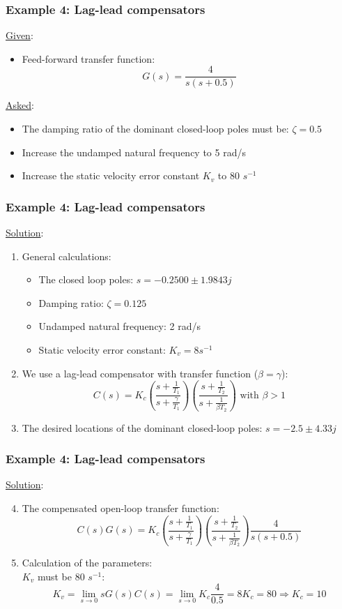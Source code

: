 \begin{frame}
	\frametitle{Example 4: Lag-lead compensators}
	\underline{Given}:
	\begin{itemize}
		\item Feed-forward transfer function: $$G(s)=\frac{4}{s(s+0.5)}$$
	\end{itemize}
	\underline{Asked}:
	\begin{itemize}
		\item The damping ratio of the dominant closed-loop poles must be: $\zeta=0.5$
		\item Increase the undamped natural frequency to 5 rad/s
		\item Increase the static velocity error constant $K_v$ to 80 $s^{-1}$
	\end{itemize}
\end{frame}

\begin{frame}
	\frametitle{Example 4: Lag-lead compensators}
	\underline{Solution}:
	\begin{enumerate}
		\item General calculations:
		\begin{itemize}
			\item The closed loop poles: $s=-0.2500\pm1.9843j$
			\item Damping ratio: $\zeta=0.125$
			\item Undamped natural frequency: 2 rad/s
			\item Static velocity error constant: $K_v=8s^{-1}$
		\end{itemize}
		\item We use a lag-lead compensator with transfer function ($\beta=\gamma$):
		$$C(s)=K_c(\frac{s+\frac{1}{T_1}}{s+\frac{\gamma}{T_1}})(\frac{s+\frac{1}{T_2}}{s+\frac{1}{\beta T_2}}) \text{ with } \beta>1$$
		\item The desired locations of the dominant closed-loop poles: $s=-2.5\pm 4.33j$
	\end{enumerate}
\end{frame}

\begin{frame}
	\frametitle{Example 4: Lag-lead compensators}
	\underline{Solution}:
	\begin{enumerate}
		\setcounter{enumi}{3}
		\item The compensated open-loop transfer function:
		$$C(s)G(s)=K_c (\frac{s+\frac{1}{T_1}}{s+\frac{\gamma}{T_1}})(\frac{s+\frac{1}{T_2}}{s+\frac{1}{\beta T_2}})\frac{4}{s(s+0.5)}$$
		\item Calculation of the parameters:\\
		$K_v$ must be 80 $s^{-1}$:
		$$K_v=\lim_{s\to0}sG(s)C(s)=\lim_{s\to0}K_c\frac{4}{0.5}=8K_c=80 \Rightarrow K_c=10$$
	\end{enumerate}
\end{frame}

